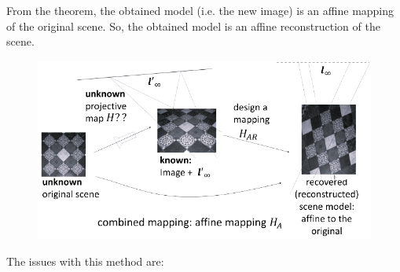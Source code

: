 \documentclass[12pt, a4paper]{report}
\begin{document}
    From the theorem, the obtained model (i.e. the new image) is an affine mapping of the original scene. So, the obtained model is an 
    affine reconstruction of the scene. 
    \begin{figure}[H]
        \centering
        \includegraphics[width=0.75\linewidth]{images/HAR.png}
    \end{figure}
    The issues with this method are: 
\end{document}

